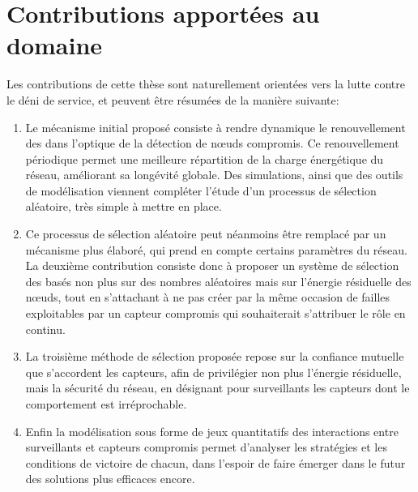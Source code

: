 \section{Contributions apportées au domaine}

Les contributions de cette thèse sont naturellement orientées vers la lutte contre le déni de service, et peuvent être résumées de la manière suivante:
\begin{enumerate}
    \item Le mécanisme initial proposé consiste à rendre dynamique le renouvellement des \cnst dans l'optique de la détection de nœuds compromis.
        Ce renouvellement périodique permet une meilleure répartition de la charge énergétique du réseau, améliorant sa longévité globale.
        Des simulations, ainsi que des outils de modélisation viennent compléter l'étude d'un processus de sélection aléatoire, très simple à mettre en place.

    \item Ce processus de sélection aléatoire peut néanmoins être remplacé par un mécanisme plus élaboré, qui prend en compte certains paramètres du réseau.
        La deuxième contribution consiste donc à proposer un système de sélection des \cnst basés non plus sur des nombres aléatoires mais sur l'énergie résiduelle des nœuds, tout en s'attachant à ne pas créer par la même occasion de failles exploitables par un capteur compromis qui souhaiterait s'attribuer le rôle en continu.

    \item La troisième méthode de sélection proposée repose sur la confiance mutuelle que s'accordent les capteurs, afin de privilégier non plus l'énergie résiduelle, mais la sécurité du réseau, en désignant pour surveillants les capteurs dont le comportement est irréprochable.

    \item Enfin la modélisation sous forme de jeux quantitatifs des interactions entre surveillants et capteurs compromis permet d'analyser les stratégies et les conditions de victoire de chacun, dans l'espoir de faire émerger dans le futur des solutions plus efficaces encore.
\end{enumerate}
